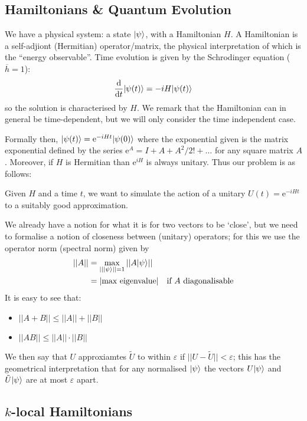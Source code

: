 \documentclass[]{article}
\DeclarePairedDelimiter\ket{\lvert}{\rangle}
\theoremstyle{custhm}
\theoremstyle{cusdef}
\theoremstyle{custhm}
\theoremstyle{custhm}
\theoremstyle{custhm}
\theoremstyle{custhm}
\theoremstyle{cusdef}
\theoremstyle{remark}
\newcommand{\e}{\mathrm{e}}
\newcommand{\eps}{\varepsilon}
\renewcommand{\bar}{\overline}
\begin{document}
\subsection*{Hamiltonians \& Quantum Evolution}

We have a physical system: a state $\ket{\psi}$, with a Hamiltonian $H$. A Hamiltonian is a self-adjiont (Hermitian) operator/matrix, the physical interpretation of which is the ``energy observable''. Time evolution is given by the Schrodinger equation ($\bar{h} = 1$):
\begin{align*}
	\frac{\textrm{d}}{\textrm{d}t}\ket{\psi(t)} = -iH\ket{\psi(t)}
\end{align*}
so the solution is characterised by $H$. We remark that the Hamiltonian can in general be time-dependent, but we will only consider the time independent case.

Formally then, $\ket{\psi(t)} = \e^{-iHt}\ket{\psi(0)}$ where the exponential given is the matrix exponential defined by the series $\e^A = I + A + A^2/2! +\dots$ for any square matrix $A$. Moreover, if $H$ is Hermitian than $\e^{iH}$ is always unitary. Thus our problem is as follows:

Given $H$ and a time $t$, we want to simulate the action of a unitary $U(t) = \e^{-iHt}$ to a suitably good approximation.

We already have a notion for what it is for two vectors to be `close', but we need to formalise a notion of closeness between (unitary) operators; for this we use the operator norm (spectral norm) given by
\begin{align*}
	||A|| &= \max_{||\ket{\psi}||=1}||A\ket{\psi}||\\
	&= |\textrm{max eigenvalue}|\quad\textrm{if $A$ diagonalisable}
\end{align*}
It is easy to see that:
\begin{itemize}
	\item $||A+B|| \le ||A|| + ||B||$
	\item $||AB|| \le ||A||\cdot||B||$
\end{itemize}

We then say that $U$ approxiamtes $\tilde{U}$ to within $\eps$ if $||U - \tilde{U}|| < \eps$; this has the geometrical interpretation that for any normalised $\ket{\psi}$ the vectors $U\ket{\psi}$ and $\tilde{U}\ket{\psi}$ are at most $\eps$ apart.

\subsection*{$k$-local Hamiltonians}
\end{document}
